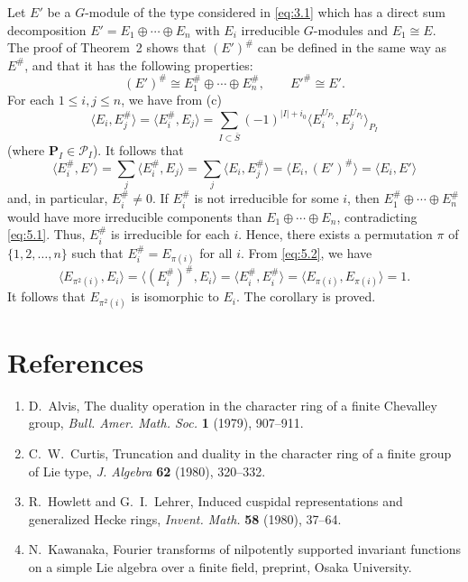 \documentclass[10pt,a4paper]{article}
\theoremstyle{plain}
\theoremstyle{definition}
\theoremstyle{remark}
\newcommand{\cP}{\mathcal{P}}
\newcommand{\bP}{\mathbf{P}}
\begin{document}
Let $E'$ be a $G$-module of the type considered in \eqref{eq:3.1} which has a direct sum decomposition $E' = E_1 \oplus \cdots \oplus E_n$ with $E_i$ irreducible $G$-modules and $E_1 \cong E$. The proof of Theorem~2 shows that $(E')^\#$ can be defined in the same way as $E^\#$, and that it has the following properties:
\begin{equation}\tag{5.1}\label{eq:5.1}
(E')^\# \cong E_1^\# \oplus \cdots \oplus E_n^\#, \qquad E'^\# \cong E'.
\end{equation}
For each $1 \leq i, j \leq n$, we have from (c)
\begin{equation}\tag{5.2}\label{eq:5.2}
\langle E_i, E_j^\# \rangle = \langle E_i^\#, E_j \rangle = \sum_{I \subset \bar S} (-1)^{|I|+i_0} \langle E_i^{U_{P_I}}, E_j^{U_{P_I}} \rangle_{P_I}
\end{equation}
(where $\bP_I \in \cP_I$). It follows that
\begin{equation*}
\langle E_i^\#, E' \rangle = \sum_j \langle E_i^\#, E_j \rangle = \sum_j \langle E_i, E_j^\# \rangle = \langle E_i, (E')^\# \rangle = \langle E_i, E' \rangle
\end{equation*}
and, in particular, $E_i^\# \neq 0$. If $E_i^\#$ is not irreducible for some $i$, then $E_1^\# \oplus \cdots \oplus E_n^\#$ would have more irreducible components than $E_1 \oplus \cdots \oplus E_n$, contradicting \eqref{eq:5.1}. Thus, $E_i^\#$ is irreducible for each $i$. Hence, there exists a permutation $\pi$ of $\{1,2,\dots,n\}$ such that $E_i^\# = E_{\pi(i)}$ for all $i$. From \eqref{eq:5.2}, we have
\begin{equation*}
\langle E_{\pi^2(i)}, E_i \rangle = \langle (E_i^\#)^\#, E_i \rangle = \langle E_i^\#, E_i^\# \rangle = \langle E_{\pi(i)}, E_{\pi(i)} \rangle = 1.
\end{equation*}
It follows that $E_{\pi^2(i)}$ is isomorphic to $E_i$. The corollary is proved.

\newpage
\section*{References}

\begin{enumerate}[label=\arabic*., leftmargin=*, itemsep=2pt]
\item D.~Alvis, The duality operation in the character ring of a finite Chevalley group, \textit{Bull. Amer. Math. Soc.} \textbf{1} (1979), 907--911.
\item C.~W.~Curtis, Truncation and duality in the character ring of a finite group of Lie type, \textit{J. Algebra} \textbf{62} (1980), 320--332.
\item R.~Howlett and G.~I.~Lehrer, Induced cuspidal representations and generalized Hecke rings, \textit{Invent. Math.} \textbf{58} (1980), 37--64.
\item N.~Kawanaka, Fourier transforms of nilpotently supported invariant functions on a simple Lie algebra over a finite field, preprint, Osaka University.
\end{enumerate}
\end{document}
